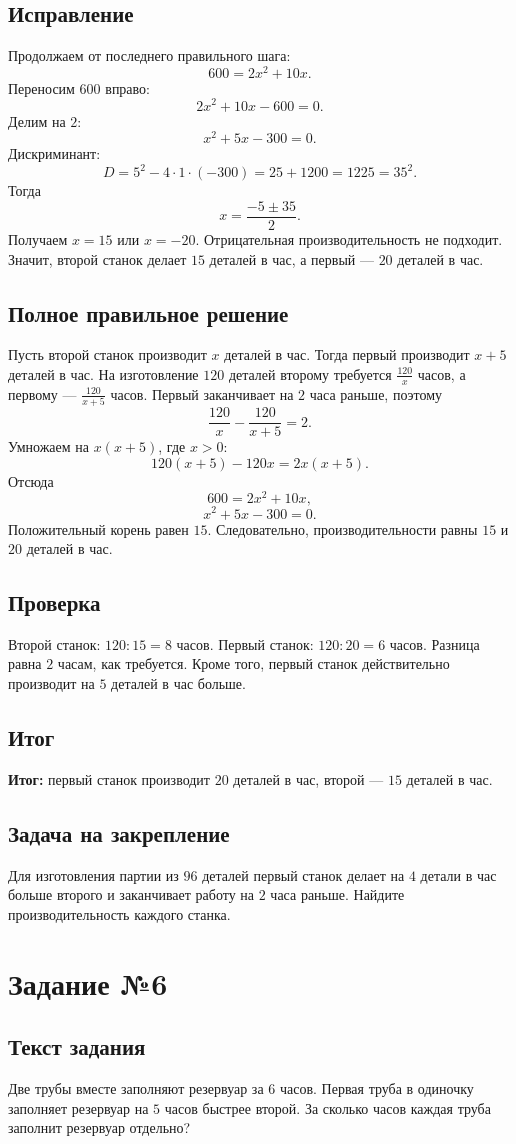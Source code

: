 \documentclass[12pt,a4paper]{article}
\newcommand{\result}{\textcolor{teal!60!black}{\textbf{Итог:}}}
\newcommand{\tasksection}[1]{\section*{Задание №#1}}
\begin{document}
\subsection*{Исправление}
Продолжаем от последнего правильного шага:
\[
600=2x^2+10x.
\]
Переносим $600$ вправо:
\[
2x^2+10x-600=0.
\]
Делим на $2$:
\[
x^2+5x-300=0.
\]
Дискриминант:
\[
D=5^2-4\cdot1\cdot(-300)=25+1200=1225=35^2.
\]
Тогда
\[
x=\frac{-5\pm35}{2}.
\]
Получаем $x=15$ или $x=-20$. Отрицательная производительность не подходит. Значит, второй станок делает $15$ деталей в час, а первый --- $20$ деталей в час.

\subsection*{Полное правильное решение}
Пусть второй станок производит $x$ деталей в час. Тогда первый производит $x+5$ деталей в час. На изготовление $120$ деталей второму требуется $\frac{120}{x}$ часов, а первому --- $\frac{120}{x+5}$ часов. Первый заканчивает на $2$ часа раньше, поэтому
\[
\frac{120}{x}-\frac{120}{x+5}=2.
\]
Умножаем на $x(x+5)$, где $x>0$:
\[
120(x+5)-120x=2x(x+5).
\]
Отсюда
\[
600=2x^2+10x,
\]
\[
x^2+5x-300=0.
\]
Положительный корень равен $15$. Следовательно, производительности равны $15$ и $20$ деталей в час.

\subsection*{Проверка}
Второй станок: $120:15=8$ часов. Первый станок: $120:20=6$ часов. Разница равна $2$ часам, как требуется. Кроме того, первый станок действительно производит на $5$ деталей в час больше.

\subsection*{Итог}
\result{} первый станок производит $20$ деталей в час, второй --- $15$ деталей в час.

\subsection*{Задача на закрепление}
Для изготовления партии из $96$ деталей первый станок делает на $4$ детали в час больше второго и заканчивает работу на $2$ часа раньше. Найдите производительность каждого станка.

\newpage
{}\label{task:6}
\tasksection{6}
\subsection*{Текст задания}
Две трубы вместе заполняют резервуар за $6$ часов. Первая труба в одиночку заполняет резервуар на $5$ часов быстрее второй. За сколько часов каждая труба заполнит резервуар отдельно?
\end{document}
